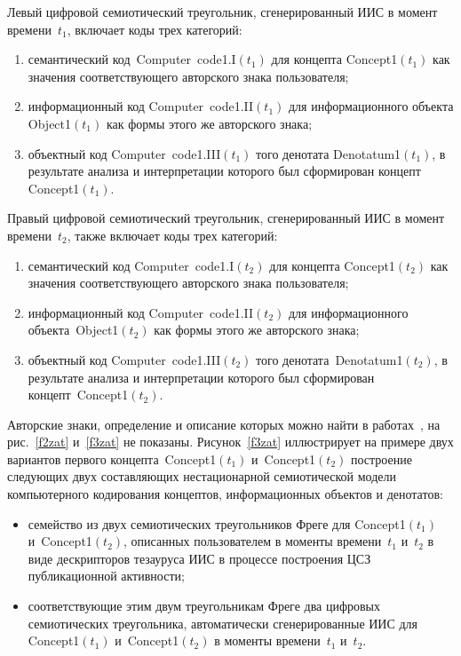 \begin{multicols}{2}
   
   Левый цифровой семиотический треугольник, сгенерированный ИИС в момент 
времени~$t_1$, включает коды трех категорий:
   \begin{enumerate}[(1)]
\item семантический код~Computer\ code1.I$(t_1)$ для концепта Concept1$(t_1)$ как 
значения соответствующего авторского знака пользователя;
\item информационный код Computer\ code1.II$(t_1)$ для информационного 
объекта Object1$(t_1)$ как формы этого же авторского знака;
\pagebreak
\item объектный код Computer\ code1.III$(t_1)$ того денотата Denotatum1$(t_1)$, в 
результате анализа и интерпретации которого был сформирован концепт 
Concept1$(t_1)$.
\end{enumerate}
   
   Правый цифровой семиотический треугольник, сгенерированный ИИС в момент 
времени~$t_2$, также включает коды трех категорий:
   \begin{enumerate}[(1)]
\item семантический код Computer\ code1.I$(t_2)$ для концепта Concept1$(t_2)$ как 
значения соответствующего авторского знака пользователя;
\item информационный код Computer\ code1.II$(t_2)$ для информационного 
объекта~Object1$(t_2)$ как формы этого же авторского знака;
\item объектный код Computer\ code1.III$(t_2)$ того денотата~Denotatum1$(t_2)$, в 
результате анализа и интерпретации которого был сформирован 
концепт~Concept1$(t_2)$.
\end{enumerate}

   Авторские знаки, определение и описание которых можно найти в работах~\cite{7zat, 
11zat}, на рис.~\ref{f2zat} и~\ref{f3zat} не показаны. Рисунок~\ref{f3zat} иллюстрирует 
на примере двух вариантов первого концепта~Concept1$(t_1)$ и~Concept1$(t_2)$ построение 
следующих двух со\-став\-ля\-ющих нестационарной семиотической модели компьютерного 
кодирования концептов, информационных объектов и денотатов:
   \begin{itemize}
\item семейство из двух семиотических треугольников Фреге для Concept1$(t_1)$ 
и~Concept1$(t_2)$, описанных пользователем в моменты времени~$t_1$ и~$t_2$ в 
виде дескрипторов тезауруса ИИС в процессе построения ЦСЗ публикационной 
активности;
\item соответствующие этим двум треугольникам Фреге два цифровых 
семиотических треугольника, автоматически сгенерированные ИИС для 
Concept1$(t_1)$ и~Concept1$(t_2)$ в моменты времени~$t_1$ и~$t_2$.
\end{itemize}



\end{multicols}
